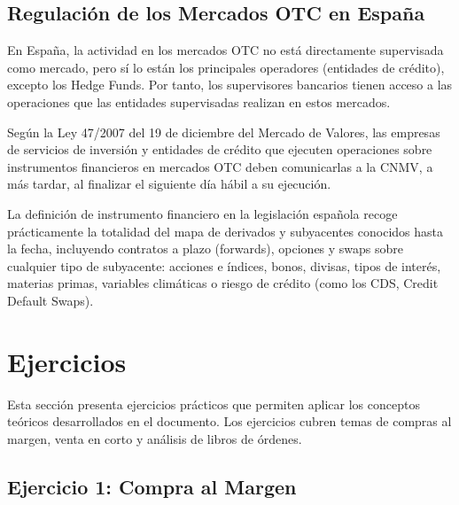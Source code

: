 \subsection{Regulación de los Mercados OTC en España}

\begin{proposicion}
En España, la actividad en los mercados OTC no está directamente supervisada como mercado, pero sí lo están los principales operadores (entidades de crédito), excepto los Hedge Funds. Por tanto, los supervisores bancarios tienen acceso a las operaciones que las entidades supervisadas realizan en estos mercados.
\end{proposicion}

\begin{teorema}
Según la Ley 47/2007 del 19 de diciembre del Mercado de Valores, las empresas de servicios de inversión y entidades de crédito que ejecuten operaciones sobre instrumentos financieros en mercados OTC deben comunicarlas a la CNMV, a más tardar, al finalizar el siguiente día hábil a su ejecución.
\end{teorema}

La definición de instrumento financiero en la legislación española recoge prácticamente la totalidad del mapa de derivados y subyacentes conocidos hasta la fecha, incluyendo contratos a plazo (forwards), opciones y swaps sobre cualquier tipo de subyacente: acciones e índices, bonos, divisas, tipos de interés, materias primas, variables climáticas o riesgo de crédito (como los CDS, Credit Default Swaps).

\section{Ejercicios}

Esta sección presenta ejercicios prácticos que permiten aplicar los conceptos teóricos desarrollados en el documento. Los ejercicios cubren temas de compras al margen, venta en corto y análisis de libros de órdenes.

\subsection{Ejercicio 1: Compra al Margen}

